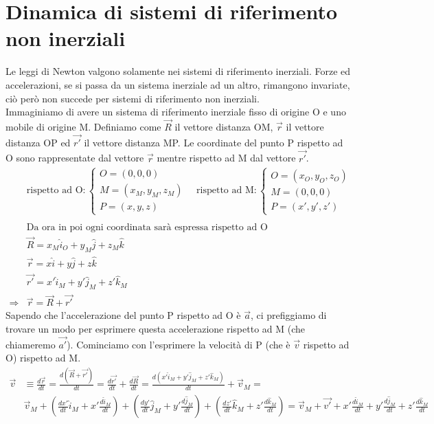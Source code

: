 \section{Dinamica di sistemi di riferimento non inerziali}
Le leggi di Newton valgono solamente nei sistemi di riferimento inerziali. Forze ed accelerazioni, se si passa da un sistema inerziale ad un altro, rimangono invariate, ciò però non succede per sistemi di riferimento non inerziali.\\
Immaginiamo di avere un sistema di riferimento inerziale fisso di origine O e uno mobile di origine M. Definiamo come $\vec{R}$ il vettore distanza OM, $\vec{r}$ il vettore distanza OP ed $\vec{r'}$ il vettore distanza MP. Le coordinate del punto P rispetto ad O sono rappresentate dal vettore $\vec{r}$ mentre rispetto ad M dal vettore $\vec{r'}$. 
\begin{align*}
	&\text{rispetto ad O}:
\begin{cases}
	O = (0 ,0 ,0)\\
	M = (x_M, y_M, z_M)\\
	P = (x, y, z)
\end{cases} \quad
	\text{rispetto ad M}:
\begin{cases}
	O = (x_O, y_O, z_O)\\
	M = (0 ,0 ,0)\\
	P = (x', y', z')
\end{cases}\\\\
	&\text{Da ora in poi ogni coordinata sarà espressa rispetto ad O}\\
	&\vec{R} = x_M \hat{i}_O + y_M \hat{j} + z_M \hat{k}\\
	&\vec{r} =  x \hat{i} + y \hat{j} + z \hat{k}\\
	&\vec{r'} =  x' \hat{i}_M + y' \hat{j}_M + z' \hat{k}_M\\
	\Rightarrow &\vec{r} = \vec{R} + \vec{r'}
\end{align*}
Sapendo che l'accelerazione del punto P rispetto ad O è $\vec{a}$, ci prefiggiamo di trovare un modo per esprimere questa accelerazione rispetto ad M (che chiameremo $\vec{a'}$). Cominciamo con l'esprimere la velocità di P (che è $\vec{v}$ rispetto ad O) rispetto ad M. 
\begin{align*}
\vec{v} &\equiv \frac{d\vec{r}}{dt} = \frac{d(\vec{R} + \vec{r'})}{dt} = \frac{d\vec{r'}}{dt}+\frac{d\vec{R}}{dt} = \frac{d(x' \hat{i}_M + y' \hat{j}_M + z' \hat{k}_M)}{dt} + \vec{v}_M=\\
&\vec{v}_M + (\frac{dx'}{dt}\hat{i}_M + x'\frac{d\hat{i}_M}{dt}) + (\frac{dy'}{dt}\hat{j}_M + y'\frac{d\hat{j}_M}{dt}) +(\frac{dz'}{dt}\hat{k}_M + z'\frac{d\hat{k}_M}{dt}) = \vec{v}_M + \vec{v'} +  x'\frac{d\hat{i}_M}{dt} + y'\frac{d\hat{j}_M}{dt} + z'\frac{d\hat{k}_M}{dt}
\end{align*}
